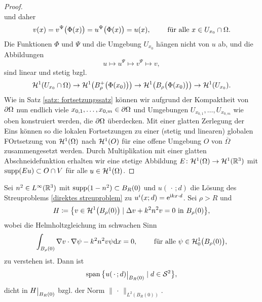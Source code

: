 \begin{proof}
\begin{equation*}
	\end{equation*}
	und daher
	\begin{equation*}
		v(x)=v^\Psi\big(\Phi(x)\big)=u^\Psi\big(\Phi(x)\big)=u(x),\qquad\text{ für alle }x\in U_{x_0}\cap\Omega.
	\end{equation*}
	Die Funktionen \(\Phi\) und \(\Psi\) und die Umgebung \(U_{x_0}\) hängen nicht von \(u\) ab, und die Abbildungen
	\begin{equation*}
		u\mapsto u^\Psi\mapsto v^\Psi\mapsto v,
	\end{equation*}
	sind linear und stetig bzgl.
	\begin{equation*}
		\mathcal{H}^1(U_{x_0}\cap\Omega)\to \mathcal{H}^1\big(B_\rho^+\big(\Phi(x_0)\big)\big)\to\mathcal{H}^1\big(B_\rho\big(\Phi(x_0)\big)\big)\to\mathcal{H}^1(U_{x_0}).
	\end{equation*}
	Wie in Satz \ref{satz: fortsetzungssatz} können wir aufgrund der Kompaktheit von \(\partial\Omega\) nun endlich viele \(x_{0,1},\ldots,x_{0,m}\in\partial\Omega\) und Umgebungen \(U_{x_{0,1}},\ldots,U_{x_{0,m}}\) wie oben konstruiert werden, die \(\partial\Omega\) überdecken. Mit einer glatten Zerlegung der Eins können so die lokalen Fortsetzungen zu einer (stetig und linearen) globalen FOrtsetzung von \(\mathcal{H}^1(\Omega)\) nach \(\mathcal{H}^1(O)\) für eine offene Umgebung \(O\) von \(\overline{\Omega}\) zusammengesetzt werden. Durch Multiplikation mit einer glatten Abschneidefunktion erhalten wir eine stetige Abbildung \(E\colon\mathcal{H}^1(\Omega) \to \mathcal{H}^1(\mathbb{R}^3)\) mit \(\operatorname{supp}(Eu)\subset O\cap V\) für alle \(u\in\mathcal{H}^1(\Omega)\).
\end{proof}
\begin{lem}\label{lem: dichtheit von span u(.,d) in H|B_R(0)}
	Sei \(n^2\in L^\infty(\mathbb{R}^3)\) mit \(\operatorname{supp}(1-n^2)\subset B_R(0)\) und \(u(\,\cdot\,;d)\) die Lösung des Streuproblems \eqref{direktes streuproblem} zu \(u^i(x;d)=\mathrm{e}^{\mathrm{i} kx\cdot d}\). Sei \(\rho>R\) und
	\begin{equation*}
		H\coloneqq\big\{v\in\mathcal{H}^1\big(B_\rho(0)\big)\mid\Delta v+k^2n^2v=0\text{ in }B_\rho(0)\big\},
	\end{equation*}
	wobei die Helmholtzgleichung im schwachen Sinn
	\begin{equation*}
		\int_{B_\rho(0)}\nabla v\cdot\nabla\psi-k^2n^2v\psi\mathrm{d}x=0,\qquad\text{ für alle }\psi\in\mathcal{H}_0^1\big(B_\rho(0)\big),
	\end{equation*}
	zu verstehen ist. Dann ist
	\begin{equation*}
		\spann\big\{u(\,\cdot\,;d)\restrict{B_R(0)}\mid d\in\SS^2\big\},
	\end{equation*}
	dicht in \(H\restrict{B_R(0)}\) bzgl. der Norm \(\|\,\cdot\,\|_{L^2(B_R(0))}\).
\end{lem}
